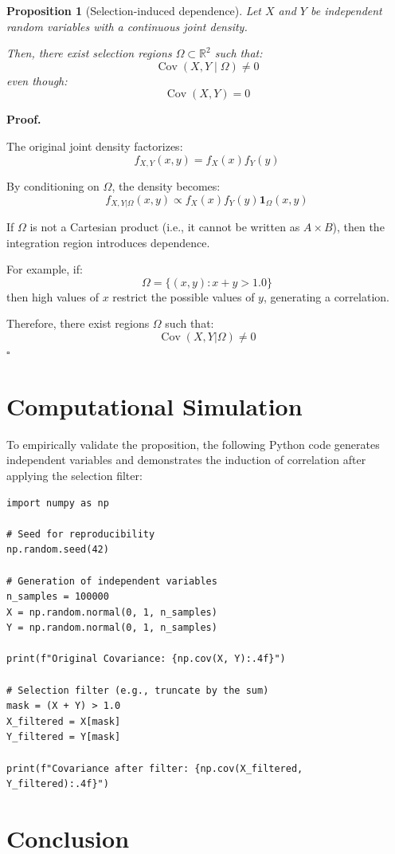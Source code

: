 \documentclass[11pt]{article}
\DeclareMathOperator{\Cov}{Cov}
\newtheorem{proposition}{Proposition}
\begin{document}
\begin{proposition}[Selection-induced dependence]
Let $X$ and $Y$ be independent random variables with a continuous joint density.

Then, there exist selection regions $\Omega \subset \mathbb{R}^2$ such that:
\[
\Cov(X,Y \mid \Omega) \neq 0
\]
even though:
\[
\Cov(X,Y) = 0
\]
\end{proposition}

\textbf{Proof.}

The original joint density factorizes:
\[
f_{X,Y}(x,y) = f_X(x)f_Y(y)
\]

By conditioning on $\Omega$, the density becomes:
\[
f_{X,Y|\Omega}(x,y) \propto f_X(x)f_Y(y)\mathbf{1}_\Omega(x,y)
\]

If $\Omega$ is not a Cartesian product (i.e., it cannot be written as $A \times B$), then the integration region introduces dependence.

For example, if:
\[
\Omega = \{(x,y): x+y>1.0\}
\]
then high values of $x$ restrict the possible values of $y$, generating a correlation.

Therefore, there exist regions $\Omega$ such that:
\[
\Cov(X,Y|\Omega) \neq 0
\]
\hfill $\square$

\section{Computational Simulation}

To empirically validate the proposition, the following Python code generates independent variables and demonstrates the induction of correlation after applying the selection filter:

\begin{lstlisting}
import numpy as np

# Seed for reproducibility
np.random.seed(42)

# Generation of independent variables
n_samples = 100000
X = np.random.normal(0, 1, n_samples)
Y = np.random.normal(0, 1, n_samples)

print(f"Original Covariance: {np.cov(X, Y):.4f}")

# Selection filter (e.g., truncate by the sum)
mask = (X + Y) > 1.0
X_filtered = X[mask]
Y_filtered = Y[mask]

print(f"Covariance after filter: {np.cov(X_filtered, Y_filtered):.4f}")
\end{lstlisting}

\section{Conclusion}
\end{document}
